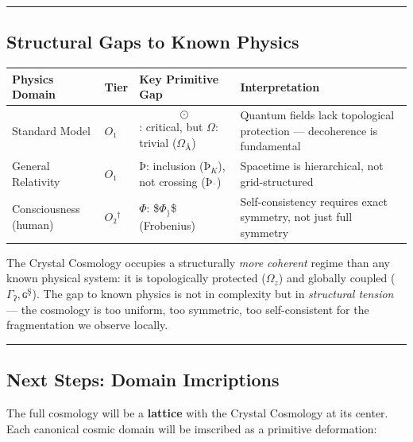 \documentclass[12pt,a4paper]{article}
\begin{document}
\begin{center}
\rule{0.5\textwidth}{0.4pt}
\end{center}

\subsection{Structural Gaps to Known Physics}

\begin{table}[htbp]
\centering
\small
{}
\begin{tabularx}{\textwidth}{>{\centering\arraybackslash}X >{\centering\arraybackslash}X >{\centering\arraybackslash}X >{\centering\arraybackslash}X}
\toprule
\rowcolor{gray!25}\textbf{Physics Domain} & \textbf{Tier} & \textbf{Key Primitive Gap} & \textbf{Interpretation} \\
\midrule
\rowcolors{1}{white}{gray!10}
Standard Model & $O₁$ & $$\odot$$: critical, but $\Omega$: trivial ($\Omega_Å$) & Quantum fields lack topological protection --- decoherence is fundamental \\
General Relativity & $O₁$ & $Þ$: inclusion ($Þ_K$), not crossing ($Þ_\text{¨}$) & Spacetime is hierarchical, not grid-structured \\
Consciousness (human) & $O₂^\dagger$ & $\Phi$: \$$\Phi_{\}}$\$ (Frobenius) & Self-consistency requires exact symmetry, not just full symmetry \\
\bottomrule
\end{tabularx}
\end{table}

The Crystal Cosmology occupies a structurally \emph{more coherent} regime than any known physical system: it is topologically protected ($\Omega_z$) and globally coupled ($\Gamma_ʔ, ɢ^Ş$). The gap to known physics is not in complexity but in \emph{structural tension} --- the cosmology is too uniform, too symmetric, too self-consistent for the fragmentation we observe locally.

\begin{center}
\rule{0.5\textwidth}{0.4pt}
\end{center}

\subsection{Next Steps: Domain Imcriptions}

The full cosmology will be a \textbf{lattice} with the Crystal Cosmology at its center. Each canonical cosmic domain will be imscribed as a primitive deformation:
\end{document}
